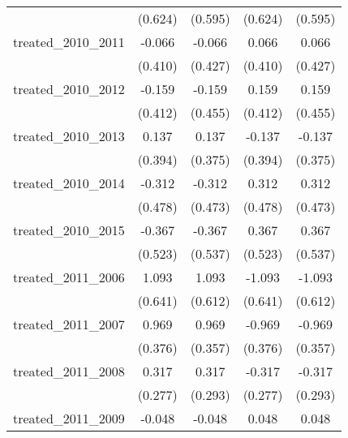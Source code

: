 {\begin{tabular}{l*{4}{c}}
            &     (0.624)         &     (0.595)         &     (0.624)         &     (0.595)         \\
[1em]
treated\_2010\_2011&      -0.066         &      -0.066         &       0.066         &       0.066         \\
            &     (0.410)         &     (0.427)         &     (0.410)         &     (0.427)         \\
[1em]
treated\_2010\_2012&      -0.159         &      -0.159         &       0.159         &       0.159         \\
            &     (0.412)         &     (0.455)         &     (0.412)         &     (0.455)         \\
[1em]
treated\_2010\_2013&       0.137         &       0.137         &      -0.137         &      -0.137         \\
            &     (0.394)         &     (0.375)         &     (0.394)         &     (0.375)         \\
[1em]
treated\_2010\_2014&      -0.312         &      -0.312         &       0.312         &       0.312         \\
            &     (0.478)         &     (0.473)         &     (0.478)         &     (0.473)         \\
[1em]
treated\_2010\_2015&      -0.367         &      -0.367         &       0.367         &       0.367         \\
            &     (0.523)         &     (0.537)         &     (0.523)         &     (0.537)         \\
[1em]
treated\_2011\_2006&       1.093         &       1.093         &      -1.093         &      -1.093         \\
            &     (0.641)         &     (0.612)         &     (0.641)         &     (0.612)         \\
[1em]
treated\_2011\_2007&       0.969\sym{**} &       0.969\sym{**} &      -0.969\sym{**} &      -0.969\sym{**} \\
            &     (0.376)         &     (0.357)         &     (0.376)         &     (0.357)         \\
[1em]
treated\_2011\_2008&       0.317         &       0.317         &      -0.317         &      -0.317         \\
            &     (0.277)         &     (0.293)         &     (0.277)         &     (0.293)         \\
[1em]
treated\_2011\_2009&      -0.048         &      -0.048         &       0.048         &       0.048         \\

\end{tabular}}
